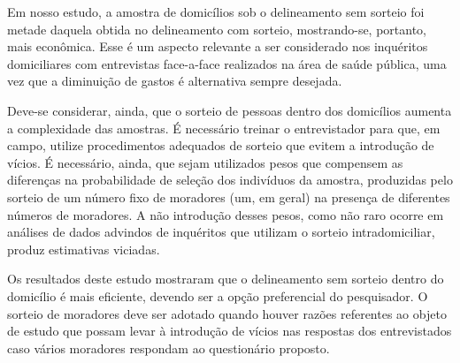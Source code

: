 \documentclass{article}
\begin{document}
Em nosso estudo, a amostra de domicílios sob o delineamento sem sorteio foi
metade daquela obtida no delineamento com sorteio, mostrando-se, portanto, mais
econômica. Esse é um aspecto relevante a ser considerado nos inquéritos
domiciliares com entrevistas face-a-face realizados na área de saúde pública,
uma vez que a diminuição de gastos é alternativa sempre desejada.

Deve-se considerar, ainda, que o sorteio de pessoas dentro dos domicílios
aumenta a complexidade das amostras. É necessário treinar o entrevistador para
que, em campo, utilize procedimentos adequados de sorteio que evitem a
introdução de vícios. É necessário, ainda, que sejam utilizados pesos que
compensem as diferenças na probabilidade de seleção dos indivíduos da amostra,
produzidas pelo sorteio de um número fixo de moradores (um, em geral) na
presença de diferentes números de moradores. A não introdução desses pesos, como
não raro ocorre em análises de dados advindos de inquéritos que utilizam o
sorteio intradomiciliar, produz estimativas viciadas.

Os resultados deste estudo mostraram que o delineamento sem sorteio dentro do
domicílio é mais eficiente, devendo ser a opção preferencial do pesquisador. O
sorteio de moradores deve ser adotado quando houver razões referentes ao objeto
de estudo que possam levar à introdução de vícios nas respostas dos
entrevistados caso vários moradores respondam ao questionário proposto.
\end{document}
